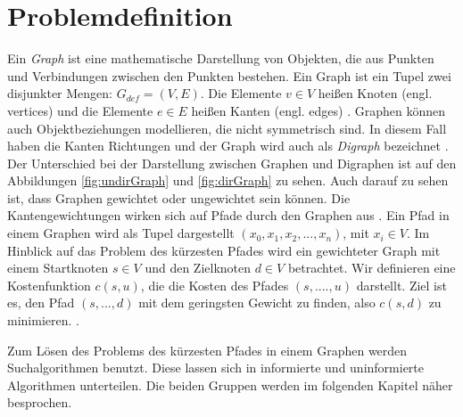 \section{Problemdefinition}
\label{Kostenfunktion}
Ein \textit{Graph} ist eine mathematische Darstellung von Objekten, die aus Punkten und Verbindungen zwischen den Punkten bestehen. 
Ein Graph ist ein Tupel zwei disjunkter Mengen: $G_{def}= (V,E)$. Die Elemente $v \in V$ heißen Knoten (engl. vertices) und die Elemente $e \in E$ heißen Kanten (engl. edges) \cite[D1]{Gross.2004}. Graphen können auch Objektbeziehungen modellieren, die nicht symmetrisch sind. In diesem Fall haben die Kanten Richtungen und der Graph wird auch als \textit{Digraph} bezeichnet \cite[D19]{Gross.2004}. Der Unterschied bei der Darstellung zwischen Graphen und Digraphen ist auf den Abbildungen \ref{fig:undirGraph} und \ref{fig:dirGraph} zu sehen. Auch darauf zu sehen ist, dass Graphen gewichtet oder ungewichtet sein können. Die Kantengewichtungen wirken sich auf Pfade durch den Graphen aus \cite[D17f.]{Gross.2004}. 
Ein Pfad in einem Graphen wird als Tupel dargestellt $\left ( x_{0}, x_{1}, x_{2}, ..., x_{n} \right )$, mit $x_{i} \in V$. 
Im Hinblick auf das Problem des kürzesten Pfades wird ein gewichteter Graph mit einem Startknoten $s \in V$ und den Zielknoten $d \in V$ betrachtet. Wir definieren eine Kostenfunktion $c(s,u)$, die die Kosten des Pfades $ (s, ...., u)$ darstellt. Ziel ist es, den Pfad  $\left ( s, ..., d \right )$ mit dem geringsten Gewicht zu finden, also $c(s,d)$ zu minimieren. \cite[S.4]{Madkour.2017}.

Zum Lösen des Problems des kürzesten Pfades in einem Graphen werden Suchalgorithmen benutzt. Diese lassen sich in informierte und uninformierte Algorithmen unterteilen. Die beiden Gruppen werden im folgenden Kapitel näher besprochen.

